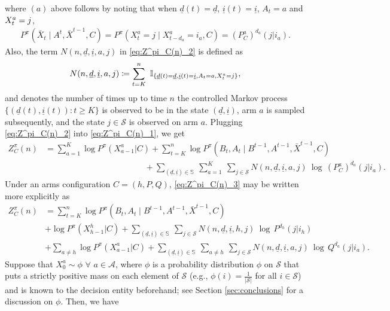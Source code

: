 where $(a)$ above follows by noting that when $\underline{d}(t)=\underline{d}$, $\underline{i}(t)=\underline{i}$, $A_t=a$ and ${\color{black} {X}_t^a=j}$, 
\begin{align}
P^\pi(\bar{X}_t\mid A^t, \bar{X}^{t-1}, C) = P^\pi(X_t^a=j\mid X_{t-d_a}^a=i_a, C)=(P_C^a)^{d_a}(j|i_a).
\end{align}
Also, the term $N(n, \underline{d}, \underline{i}, a, j)$ in \eqref{eq:Z^pi_C(n)_2} is defined as
\begin{equation}
N(n, \underline{d}, \underline{i}, a, j) \coloneqq \sum\limits_{t=K}^{n} ~ \mathbb{I}_{\{\underline{d}(t)=\underline{d}, \underline{i}(t)=\underline{i}, A_t=a, {\color{black} {X}_t^a=j}\}} ,
\label{eq:N(n, d, i, a, j)}
\end{equation}
and denotes the number of times up to time $n$ the controlled Markov process $\{(\underline{d}(t), \underline{i}(t)): t\geq K\}$ is observed to be in the state $(\underline{d}, \underline{i})$, arm $a$ is sampled subsequently, and the state $j\in \mathcal{S}$ is observed on arm $a$. Plugging \eqref{eq:Z^pi_C(n)_2} into \eqref{eq:Z^pi_C(n)_1}, we get
\begin{align}
	Z^\pi_C(n)
	& = \sum\limits_{a=1}^{K} \log P^\pi(X_{a-1}^a|C) + \sum\limits_{t=K}^{n} \log P^\pi(B_t, A_t\mid B^{t-1}, A^{t-1}, \bar{X}^{t-1}, C) \nonumber\\
	&\hspace{5cm}+ \sum\limits_{(\underline{d}, \underline{i}) \in \mathbb{S}} ~\sum\limits_{a=1}^{K}~\sum\limits_{j\in \mathcal{S}} N(n, \underline{d}, \underline{i}, a, j)~\log \, (P_C^a)^{d_a}(j|i_a).
	\label{eq:Z^pi_C(n)_3}
\end{align}
Under an arms configuration $C=(h, P, Q)$, \eqref{eq:Z^pi_C(n)_3} may be written more explicitly as
\begin{align}
	Z^\pi_C(n) 
	& = \sum\limits_{t=K}^{n} \log P^\pi(B_t, A_t\mid B^{t-1}, A^{t-1}, \bar{X}^{t-1}, C)\label{eq:Z^pi_C(n)_4_1}\\
	& + \log P^\pi(X_{h-1}^h| C) + \sum\limits_{(\underline{d}, \underline{i}) \in \mathbb{S}}~\sum\limits_{j\in \mathcal{S}} N(n, \underline{d}, \underline{i}, h, j)~\log \, P^{d_h}(j|i_h)\label{eq:Z^pi_C(n)_4_2}\\
	& + \sum\limits_{a\neq h} \log P^\pi(X_{a-1}^a|C) + \sum\limits_{(\underline{d}, \underline{i}) \in \mathbb{S}} ~\sum\limits_{a\neq h}~\sum\limits_{j\in \mathcal{S}} N(n, \underline{d}, \underline{i}, a, j)~\log \, Q^{d_a}(j|i_a).\label{eq:Z^pi_C(n)_4_3}
\end{align}
Suppose that $X_0^a\sim \phi$ $\forall$ $a\in \mathcal{A}$, where $\phi$ is a probability distribution $\phi$ on $\mathcal{S}$ that puts a strictly positive mass on each element of $\mathcal{S}$ (e.g., $\phi(i)=\frac{1}{|\mathcal{S}|}$ for all $i\in \mathcal{S}$) and is known to the decision entity beforehand; see Section \ref{sec:conclusions} for a discussion on $\phi$. Then, we have
